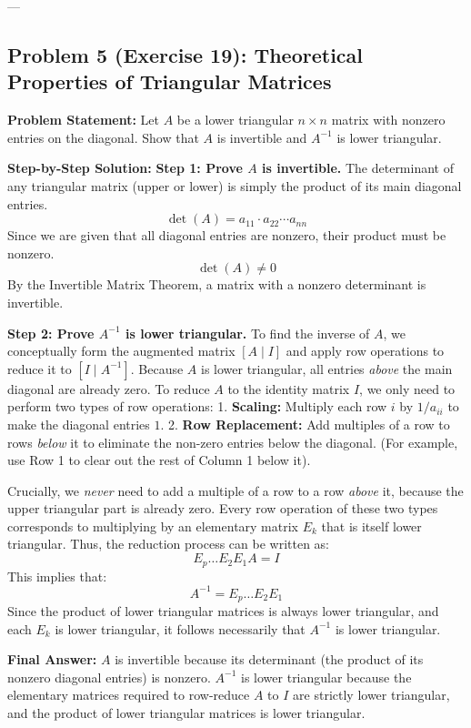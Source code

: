 \documentclass[11pt]{article}
\begin{document}
---

\subsection{Problem 5 (Exercise 19): Theoretical Properties of Triangular Matrices}
\textbf{Problem Statement:} Let $A$ be a lower triangular $n \times n$ matrix with nonzero entries on the diagonal. Show that $A$ is invertible and $A^{-1}$ is lower triangular.

\textbf{Step-by-Step Solution:}
\textbf{Step 1: Prove $A$ is invertible.}
The determinant of any triangular matrix (upper or lower) is simply the product of its main diagonal entries.
\[ \det(A) = a_{11} \cdot a_{22} \cdots a_{nn} \]
Since we are given that all diagonal entries are nonzero, their product must be nonzero.
\[ \det(A) \neq 0 \]
By the Invertible Matrix Theorem, a matrix with a nonzero determinant is invertible.

\textbf{Step 2: Prove $A^{-1}$ is lower triangular.}
To find the inverse of $A$, we conceptually form the augmented matrix $[A \mid I]$ and apply row operations to reduce it to $[I \mid A^{-1}]$.
Because $A$ is lower triangular, all entries \textit{above} the main diagonal are already zero. To reduce $A$ to the identity matrix $I$, we only need to perform two types of row operations:
1. \textbf{Scaling:} Multiply each row $i$ by $1/a_{ii}$ to make the diagonal entries $1$.
2. \textbf{Row Replacement:} Add multiples of a row to rows \textit{below} it to eliminate the non-zero entries below the diagonal. (For example, use Row 1 to clear out the rest of Column 1 below it).

Crucially, we \textit{never} need to add a multiple of a row to a row \textit{above} it, because the upper triangular part is already zero.
Every row operation of these two types corresponds to multiplying by an elementary matrix $E_k$ that is itself lower triangular.
Thus, the reduction process can be written as:
\[ E_p \dots E_2 E_1 A = I \]
This implies that:
\[ A^{-1} = E_p \dots E_2 E_1 \]
Since the product of lower triangular matrices is always lower triangular, and each $E_k$ is lower triangular, it follows necessarily that $A^{-1}$ is lower triangular.

\textbf{Final Answer:}
$A$ is invertible because its determinant (the product of its nonzero diagonal entries) is nonzero. $A^{-1}$ is lower triangular because the elementary matrices required to row-reduce $A$ to $I$ are strictly lower triangular, and the product of lower triangular matrices is lower triangular.
\end{document}
